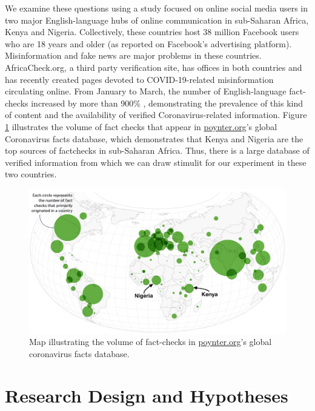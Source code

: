 \documentclass[letterpaper, 12pt, parskip=full,DIV=12]{scrartcl}
\begin{document}
We examine these questions using a study focused on online social media users in two major English-language hubs of online communication in sub-Saharan Africa, Kenya and Nigeria.  Collectively, these countries host 38 million Facebook users who are 18 years and older (as reported on Facebook's advertising platform). Misinformation and fake news are major problems in these countries. AfricaCheck.org, a third party verification site, has offices in both countries and has recently created pages devoted to COVID-19-related misinformation circulating online. From January to March, the number of English-language fact-checks increased by more than 900\% \citep{brennen2020types}, demonstrating the prevalence of this kind of content and the availability of verified Coronavirus-related information.  Figure \ref{fig:poynter} illustrates the volume of fact checks that appear in \url{poynter.org}'s global Coronavirus facts database, which demonstrates that Kenya and Nigeria are the top sources of factchecks in sub-Saharan Africa. Thus, there is a large database of verified information from which we can draw stimulit for our experiment in these two countries. 


\begin{figure}[htb]
\centering
\caption{Map illustrating the volume of fact-checks in \url{poynter.org}'s global coronavirus facts database.}
\label{fig:poynter}
\includegraphics[width=.95\textwidth]{poynter2.png}
\end{figure}


\section{Research Design and Hypotheses}
\end{document}
